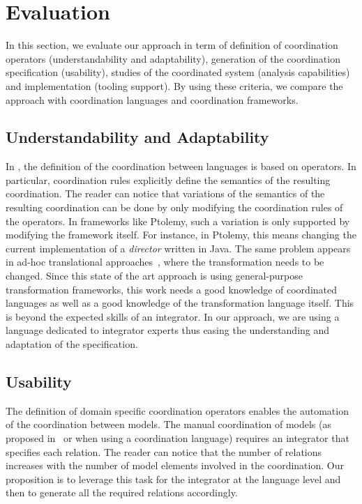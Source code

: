 \section{Evaluation}
\label{sec:evaluation}

In this section, we evaluate our approach in term of definition of coordination operators (\ie understandability and adaptability), generation of the coordination specification (\ie usability), studies of the coordinated system (\ie analysis capabilities) and implementation (\ie tooling support).  By using these criteria, we compare the approach with coordination languages and coordination frameworks.

\subsection{Understandability and Adaptability}
In \bcool, the definition of the coordination between languages is based on operators. In particular, coordination rules explicitly define the semantics of the resulting coordination. The reader can notice that variations of the semantics of the resulting coordination can be done by only modifying the coordination rules of the operators. In frameworks like Ptolemy, such a variation is only supported by modifying the framework itself. For instance, in Ptolemy, this means changing the current implementation of a \emph{director} written in Java. The same problem appears in ad-hoc translational approaches~\cite{dinatale}, where the transformation needs to be changed. Since this state of the art approach is using general-purpose transformation frameworks, this work needs a good knowledge of coordinated languages as well as a good knowledge of the transformation language itself. This is beyond the expected skills of an integrator. In our approach, we are using a language dedicated to integrator experts thus easing the understanding and adaptation of the \bcool specification. 

\subsection{Usability}
The definition of domain specific coordination operators enables the automation of the coordination between models. The manual coordination of models (as proposed in~\cite{varalarsen:gemoc13} or when using a coordination language) requires an integrator that specifies each relation. The reader can notice that the number of relations increases with the number of model elements involved in the coordination. Our proposition is to leverage this task for the integrator at the language level and then to generate all the required relations accordingly.

